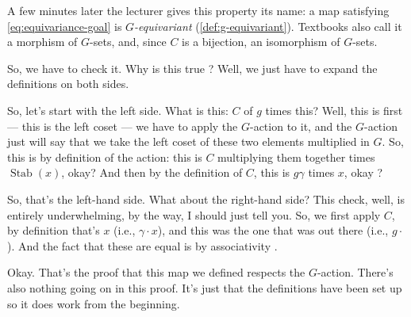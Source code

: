 \begin{aiNote}
A few minutes later the lecturer gives this property its name: a map satisfying \eqref{eq:equivariance-goal} is \emph{$G$-equivariant} (\cref{def:g-equivariant}). Textbooks also call it a morphism of $G$-sets, and, since $C$ is a bijection, an isomorphism of $G$-sets.
\end{aiNote}

\begin{hidden}
\end{hidden}

\begin{speech}[00:17:55 - 00:19:25]
So, we have to check it. Why is this true ? Well, we just have to expand the definitions on both sides.

So, let's start with the left side. What is this: $C$ of $g$ times this? Well, this is first --- this is the left coset --- we have to apply the $G$-action to it, and the $G$-action just will say that we take the left coset of these two elements multiplied in $G$. So, this is by definition of the action: this is $C$ multiplying them together times $\operatorname{Stab}(x)$, okay? And then by the definition of $C$, this is $g \gamma$ times $x$, okay ?

So, that's the left-hand side. What about the right-hand side? This check, well, is entirely underwhelming, by the way, I should just tell you. So, we first apply $C$, by definition that's $x$ (i.e., $\gamma \cdot x$), and this was the one that was out there (i.e., $g \cdot$). And the fact that these are equal is by associativity .

Okay. That's the proof that this map we defined respects the $G$-action. There's also nothing going on in this proof. It's just that the definitions have been set up so it does work from the beginning.
\end{speech}

